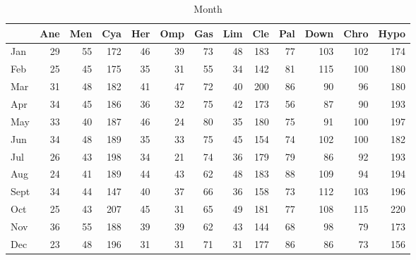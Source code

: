 \documentclass[article,nojss]{jss}\usepackage[]{graphicx}\usepackage[]{color}
\newenvironment{knitrout}{}{} %
\begin{document}
\begin{knitrout}
\color{fgcolor}\begin{table}[H]

\caption{\label{tab:monthdata}Month\label{tab:month}}
\centering
\begin{tabular}[t]{l|r|r|r|r|r|r|r|r|r|r|r|r}
\hline
  & Ane & Men & Cya & Her & Omp & Gas & Lim & Cle & Pal & Down & Chro & Hypo\\
\hline
Jan & 29 & 55 & 172 & 46 & 39 & 73 & 48 & 183 & 77 & 103 & 102 & 174\\
\hline
Feb & 25 & 45 & 175 & 35 & 31 & 55 & 34 & 142 & 81 & 115 & 100 & 180\\
\hline
Mar & 31 & 48 & 182 & 41 & 47 & 72 & 40 & 200 & 86 & 90 & 96 & 180\\
\hline
Apr & 34 & 45 & 186 & 36 & 32 & 75 & 42 & 173 & 56 & 87 & 90 & 193\\
\hline
May & 33 & 40 & 187 & 46 & 24 & 80 & 35 & 180 & 75 & 91 & 100 & 197\\
\hline
Jun & 34 & 48 & 189 & 35 & 33 & 75 & 45 & 154 & 74 & 102 & 100 & 182\\
\hline
Jul & 26 & 43 & 198 & 34 & 21 & 74 & 36 & 179 & 79 & 86 & 92 & 193\\
\hline
Aug & 24 & 41 & 189 & 44 & 43 & 62 & 48 & 183 & 88 & 109 & 94 & 194\\
\hline
Sept & 34 & 44 & 147 & 40 & 37 & 66 & 36 & 158 & 73 & 112 & 103 & 196\\
\hline
Oct & 25 & 43 & 207 & 45 & 31 & 65 & 49 & 181 & 77 & 108 & 115 & 220\\
\hline
Nov & 36 & 55 & 188 & 39 & 39 & 62 & 43 & 144 & 68 & 98 & 79 & 173\\
\hline
Dec & 23 & 48 & 196 & 31 & 31 & 71 & 31 & 177 & 86 & 86 & 73 & 156\\
\hline
\end{tabular}
\end{table}

\end{knitrout}
\end{document}
